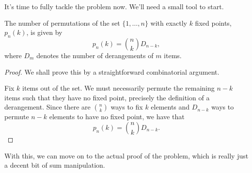 It's time to fully tackle the problem now. We'll need a small tool to start.
\begin{proposition}
    The number of permutations of the set \( \{ 1, \ldots, n \} \) with exactly \( k \) fixed points, \( p_n (k) \), is given by
    \[
        p_n(k) = \binom{n}{k} D_{n - k}
    ,\]
    where \( D_m \) denotes the number of derangements of \( m \) items.
\end{proposition}
\begin{proof}
    We shall prove this by a straightforward combinatorial argument.

    Fix \( k \) items out of the set. We must necessarily permute the remaining
    \( n - k \) items such that they have no fixed point, precisely the
    definition of a derangement. Since there are \( \binom{n}{k} \) ways to fix
    \( k \) elements and \( D_{n - k} \) ways to permute \( n - k \) elements
    to have no fixed point, we have that
    \[
        p_n (k) = \binom{n}{k} D_{n - k}
    .\]
\end{proof}
With this, we can move on to the actual proof of the problem, which is really
just a decent bit of sum manipulation.
